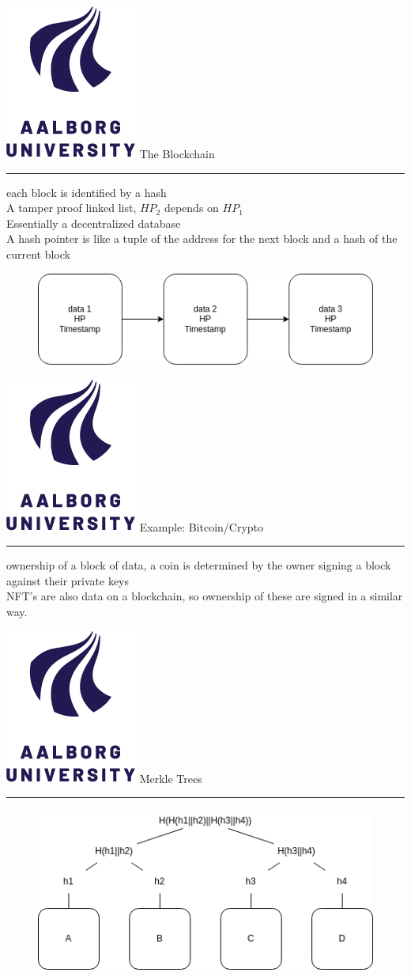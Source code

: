 \documentclass[aspectratio=1610,17pt,utf8]{beamer}
\newcommand{\regularframe}[1]{\color{black}\includegraphics[width=.05\textwidth]{figures/aau.png} #1\\\hrule}
\begin{document}
\begin{frame}{\regularframe{The Blockchain}}
    each block is identified by a hash\\
    A tamper proof linked list, $HP_2$ depends on $HP_1$\\
    Essentially a decentralized database\\
    A hash pointer is like a tuple of the address for the next block and a hash of the current block
    \begin{figure}
        \includegraphics[width=\textwidth]{figures/blockchain.drawio.png}
    \end{figure}
\end{frame}

\begin{frame}{\regularframe{Example: Bitcoin/Crypto}}
    ownership of a block of data, a coin is determined by the owner signing a block against their private keys\\
    NFT's are also data on a blockchain, so ownership of these are signed in a similar way.
\end{frame}

\begin{frame}{\regularframe{Merkle Trees}}
    \begin{figure}
        \includegraphics[width=\textwidth]{figures/merkle.drawio.png}
    \end{figure}
\end{frame}

\end{document}
